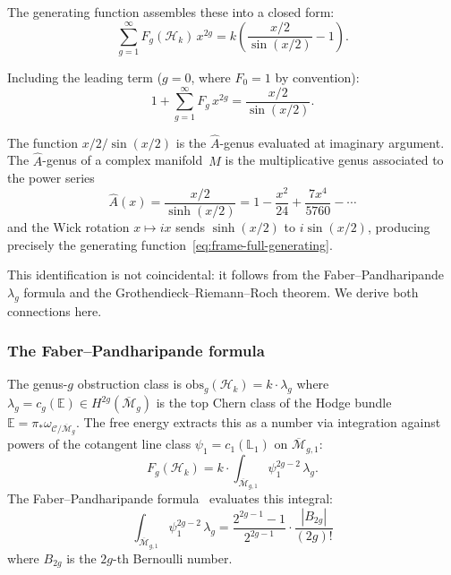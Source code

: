 The generating function assembles these into a closed form:
\begin{equation}\label{eq:frame-generating-function}
\sum_{g=1}^{\infty} F_g(\mathcal{H}_k)\, x^{2g}
= k\left(\frac{x/2}{\sin(x/2)} - 1\right).
\end{equation}

Including the leading term ($g = 0$, where $F_0 = 1$ by convention):
\begin{equation}\label{eq:frame-full-generating}
1 + \sum_{g=1}^{\infty} F_g\, x^{2g}
= \frac{x/2}{\sin(x/2)}.
\end{equation}

The function $x/2 / \sin(x/2)$ is the $\hat{A}$-genus evaluated at
imaginary argument.  The $\hat{A}$-genus of a complex manifold~$M$
is the multiplicative genus associated to the power series
\begin{equation}\label{eq:frame-a-hat-def}
\hat{A}(x) = \frac{x/2}{\sinh(x/2)}
= 1 - \frac{x^2}{24} + \frac{7x^4}{5760} - \cdots
\end{equation}
and the Wick rotation $x \mapsto ix$ sends $\sinh(x/2)$ to
$i\sin(x/2)$, producing precisely the generating
function~\eqref{eq:frame-full-generating}.

This identification is not coincidental: it follows from the
Faber--Pandharipande $\lambda_g$ formula and the Grothendieck--Riemann--Roch
theorem.  We derive both connections here.

\subsubsection*{The Faber--Pandharipande formula}

The genus-$g$ obstruction class is
$\mathrm{obs}_g(\mathcal{H}_k) = k \cdot \lambda_g$
where $\lambda_g = c_g(\mathbb{E}) \in H^{2g}(\overline{\mathcal{M}}_g)$
is the top Chern class of the Hodge bundle
$\mathbb{E} = \pi_*\omega_{\mathcal{C}/\overline{\mathcal{M}}_g}$.
The free energy extracts this as a number via integration against
powers of the cotangent line class $\psi_1 = c_1(\mathbb{L}_1)$
on $\overline{\mathcal{M}}_{g,1}$:
\begin{equation}\label{eq:frame-fp-integral}
F_g(\mathcal{H}_k) = k \cdot
\int_{\overline{\mathcal{M}}_{g,1}} \psi_1^{2g-2}\, \lambda_g.
\end{equation}
The Faber--Pandharipande formula~\cite{FP00} evaluates this integral:
\begin{equation}\label{eq:frame-fp-formula}
\int_{\overline{\mathcal{M}}_{g,1}} \psi_1^{2g-2}\, \lambda_g
= \frac{2^{2g-1}-1}{2^{2g-1}} \cdot \frac{|B_{2g}|}{(2g)!}
\end{equation}
where $B_{2g}$ is the $2g$-th Bernoulli number.

